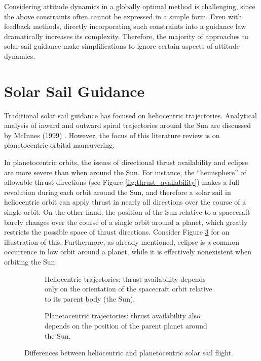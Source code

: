Considering attitude dynamics in a globally optimal method is challenging, since the above constraints often cannot be expressed in a simple form. Even with feedback methods, directly incorporating such constraints into a guidance law dramatically increases its complexity. Therefore, the majority of approaches to solar sail guidance make simplifications to ignore certain aspects of attitude dynamics.


\section{Solar Sail Guidance}
\label{sec:solar_sail_guidance}
Traditional solar sail guidance has focused on heliocentric trajectories. Analytical analysis of inward and outward spiral trajectories around the Sun are discussed by McInnes (1999) \cite{mcinnes}. However, the focus of this literature review is on planetocentric orbital maneuvering.

In planetocentric orbits, the issues of directional thrust availability and eclipse are more severe than when around the Sun. For instance, the ``hemisphere'' of allowable thrust directions (see Figure \ref{fig:thrust_availability}) makes a full revolution during each orbit around the Sun, and therefore a solar sail in heliocentric orbit can apply thrust in nearly all directions over the course of a single orbit. On the other hand, the position of the Sun relative to a spacecraft barely changes over the course of a single orbit around a planet, which greatly restricts the possible space of thrust directions. Consider Figure \ref{fig:angle_availability} for an illustration of this. Furthermore, as already mentioned, eclipse is a common occurrence in low orbit around a planet, while it is effectively nonexistent when orbiting the Sun.

\begin{figure}[H]
  \centering
  \begin{subfigure}[t]{0.45\textwidth}
    
    \caption{Heliocentric trajectories: thrust availability depends only on the orientation of the spacecraft orbit relative to its parent body (the Sun).}
    \label{fig:angle_availability_sun}
  \end{subfigure}
  \hfill
  \begin{subfigure}[t]{0.45\textwidth}
    
    \caption{Planetocentric trajectories: thrust availability also depends on the position of the parent planet around the Sun.}
    \label{fig:angle_availability_earth}
  \end{subfigure}
  \caption{Differences between heliocentric and planetocentric solar sail flight.}
  \label{fig:angle_availability}
\end{figure}

